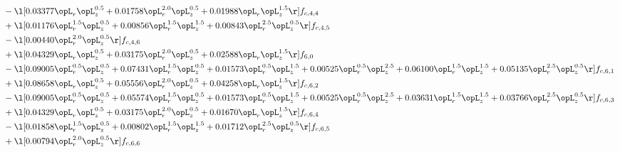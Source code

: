 \begin{alignat}{2}
& - \l[  0.03377 \opL_r \opL_z^{0.5} +  0.01758 \opL_r^{2.0} \opL_z^{0.5} +  0.01988 \opL_r \opL_z^{1.5}  \r] f_{c,4,4} \nonumber \\ 
& + \l[  0.01176 \opL_r^{1.5} \opL_z^{0.5} +  0.00856 \opL_r^{1.5} \opL_z^{1.5} +  0.00843 \opL_r^{2.5} \opL_z^{0.5}  \r] f_{c,4,5} \nonumber \\ 
& - \l[  0.00440 \opL_r^{2.0} \opL_z^{0.5}  \r] f_{c,4,6} \nonumber \\ 
& + \l[  0.04329 \opL_r \opL_z^{0.5} +  0.03175 \opL_r^{2.0} \opL_z^{0.5} +  0.02588 \opL_r \opL_z^{1.5}  \r] f_{6,0} \nonumber \\ 
& - \l[  0.09005 \opL_r^{0.5} \opL_z^{0.5} +  0.07431 \opL_r^{1.5} \opL_z^{0.5} +  0.01573 \opL_r^{0.5} \opL_z^{1.5} +  0.00525 \opL_r^{0.5} \opL_z^{2.5} +  0.06100 \opL_r^{1.5} \opL_z^{1.5} +  0.05135 \opL_r^{2.5} \opL_z^{0.5}  \r] f_{c,6,1} \nonumber \\ 
& + \l[  0.08658 \opL_r \opL_z^{0.5} +  0.05556 \opL_r^{2.0} \opL_z^{0.5} +  0.04258 \opL_r \opL_z^{1.5}  \r] f_{c,6,2} \nonumber \\ 
& - \l[  0.09005 \opL_r^{0.5} \opL_z^{0.5} +  0.05574 \opL_r^{1.5} \opL_z^{0.5} +  0.01573 \opL_r^{0.5} \opL_z^{1.5} +  0.00525 \opL_r^{0.5} \opL_z^{2.5} +  0.03631 \opL_r^{1.5} \opL_z^{1.5} +  0.03766 \opL_r^{2.5} \opL_z^{0.5}  \r] f_{c,6,3} \nonumber \\ 
& + \l[  0.04329 \opL_r \opL_z^{0.5} +  0.03175 \opL_r^{2.0} \opL_z^{0.5} +  0.01670 \opL_r \opL_z^{1.5}  \r] f_{c,6,4} \nonumber \\ 
& - \l[  0.01858 \opL_r^{1.5} \opL_z^{0.5} +  0.00802 \opL_r^{1.5} \opL_z^{1.5} +  0.01712 \opL_r^{2.5} \opL_z^{0.5}  \r] f_{c,6,5} \nonumber \\ 
& + \l[  0.00794 \opL_r^{2.0} \opL_z^{0.5}  \r] f_{c,6,6} \nonumber \\ 
\end{alignat} 



